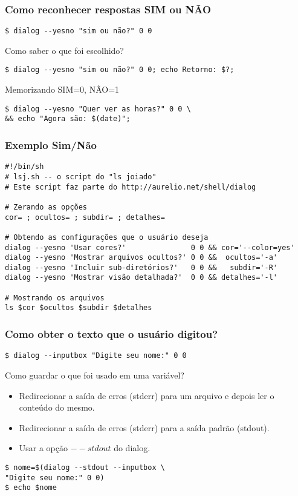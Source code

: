 \documentclass{beamer}
\begin{document}
   \begin{frame}[fragile]
      \frametitle{Como reconhecer respostas SIM ou NÃO}
      \begin{verbatim}
$ dialog --yesno "sim ou não?" 0 0 
      \end{verbatim}
      Como saber o que foi escolhido?
      \begin{verbatim}
$ dialog --yesno "sim ou não?" 0 0; echo Retorno: $?; 
      \end{verbatim}
      \begin{block}{Memorizando}
      SIM=0, NÃO=1
      \end{block}
      \begin{verbatim}
$ dialog --yesno "Quer ver as horas?" 0 0 \
&& echo "Agora são: $(date)"; 
      \end{verbatim}
\end{frame}

   \begin{frame}[fragile]
      \frametitle{Exemplo Sim/Não}
      \scriptsize
      \begin{verbatim}
#!/bin/sh
# lsj.sh -- o script do "ls joiado"
# Este script faz parte do http://aurelio.net/shell/dialog

# Zerando as opções
cor= ; ocultos= ; subdir= ; detalhes=

# Obtendo as configurações que o usuário deseja
dialog --yesno 'Usar cores?'               0 0 && cor='--color=yes'
dialog --yesno 'Mostrar arquivos ocultos?' 0 0 &&  ocultos='-a'
dialog --yesno 'Incluir sub-diretórios?'   0 0 &&   subdir='-R'
dialog --yesno 'Mostrar visão detalhada?'  0 0 && detalhes='-l'

# Mostrando os arquivos
ls $cor $ocultos $subdir $detalhes      
      \end{verbatim}
\end{frame}

   \begin{frame}[fragile]
      \frametitle{Como obter o texto que o usuário digitou?}
      \begin{verbatim}
$ dialog --inputbox "Digite seu nome:" 0 0 
      \end{verbatim}
      Como guardar o que foi usado em uma variável? \\
      \begin{itemize}
         \item Redirecionar a saída de erros (stderr) para um arquivo e depois ler o conteúdo do mesmo.
	 \item Redirecionar a saída de erros (stderr) para a saída padrão (stdout).
	 \item Usar a opção $--stdout$ do dialog.
      \end{itemize}
      \begin{verbatim}
$ nome=$(dialog --stdout --inputbox \
"Digite seu nome:" 0 0)
$ echo $nome
      \end{verbatim}
\end{frame}
\end{document}
